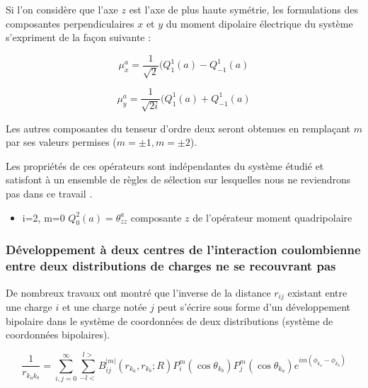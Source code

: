 	Si l'on considère que l'axe $z$ est l'axe de plus haute symétrie, les formulations des composantes perpendiculaires $x$ et $y$ du moment dipolaire électrique du système s'expriment de la façon suivante : 
	
	\begin{equation}
	\mu_{x}^{a} = \frac{1}{\sqrt{2}} (Q_{1}^{1}(a)- Q_{-1}^{1}(a)
	\end{equation}
	
	\begin{equation}
	\mu_{y}^{a} = \frac{1}{\sqrt{2i}} (Q_{1}^{1}(a)+ Q_{-1}^{1}(a)
	\end{equation}
	
	Les autres composantes du tenseur d'ordre deux seront obtenues en remplaçant $m$ par ses valeurs permises ($m=\pm 1, m=\pm 2$).
	
	Les propriétés de ces opérateurs sont indépendantes du système étudié et satisfont à un ensemble de règles de sélection sur lesquelles nous ne reviendrons pas dans ce travail \cite{hall2015lie}. 
	
	\begin{itemize}
		\item i=2, m=0 \hspace{1cm} $Q_{0}^{2}(a) = \theta_{zz}^{a}$ \hspace{1cm} composante $z$ de l'opérateur moment quadripolaire 
	\end{itemize}
	
	\subsubsection{Développement à deux centres de l'interaction coulombienne entre deux distributions de charges ne se recouvrant pas}
	
	De nombreux travaux \cite{buehler1951bipolar,hylleraas1931elektronenterme,proctor1977long,davison1968atomic} ont montré que l'inverse de la distance $r_{ij}$ existant entre une charge $i$ et une charge notée $j$ peut s'écrire sous forme d'un développement bipolaire dans le système de coordonnées de deux distributions (système de coordonnées bipolaires).
	
	\begin{equation}
	\frac{1}{r_{k_{a}k_{b}}} = \sum_{i,j=0}^{\infty} \sum_{-l<}^{l>} B_{ij}^{|m|}(r_{k_{a}}, r_{k_{b}}; R) P_{i}^{m} (\cos\theta_{k_{b}}) P_{j}^{m}(\cos\theta_{k_{a}}) e^{im(\phi_{k_{a}}-\phi_{k_{b}})}
	\end{equation}
	

